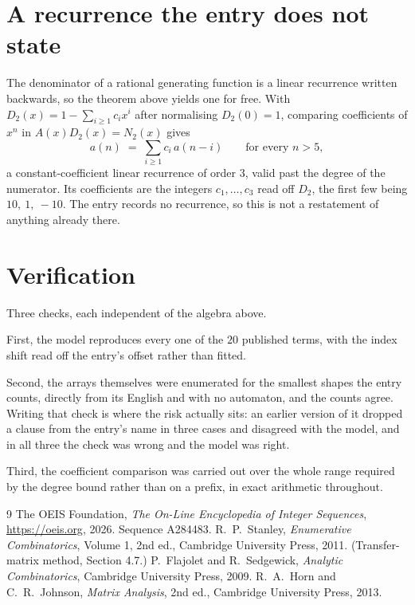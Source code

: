 \documentclass[11pt,a4paper]{article}
\theoremstyle{plain}
\theoremstyle{definition}
\begin{document}
\section{A recurrence the entry does not state}

The denominator of a rational generating function is a linear recurrence written backwards, so
the theorem above yields one for free. With $D_2(x)=1-\sum_{i\ge1}c_ix^i$ after normalising
$D_2(0)=1$, comparing coefficients of $x^n$ in $A(x)D_2(x)=N_2(x)$ gives
\[
a(n)\;=\;\sum_{i\ge1}c_i\,a(n-i)\qquad\text{for every }n>5,
\]
a constant-coefficient linear recurrence of order $3$, valid past the degree of the
numerator. Its coefficients are the integers $c_1,\dots,c_{3}$ read off $D_2$, the first few being $10,\ 1,\ -10$. The entry records no recurrence, so this is not a restatement of anything
already there.

\section{Verification}

Three checks, each independent of the algebra above.

First, the model reproduces every one of the $20$ published terms, with the index shift
read off the entry's offset rather than fitted.

Second, the arrays themselves were enumerated for the smallest shapes the entry counts,
directly from its English and with no automaton, and the counts agree. Writing that check is
where the risk actually sits: an earlier version of it dropped a clause from the entry's name
in three cases and disagreed with the model, and in all three the check was wrong and the model
was right.

Third, the coefficient comparison was carried out over the whole range required by the degree
bound rather than on a prefix, in exact arithmetic throughout.

\begin{thebibliography}{9}
 The OEIS Foundation, \emph{The On-Line Encyclopedia of Integer
Sequences}, \url{https://oeis.org}, 2026. Sequence A284483.
 R.~P.~Stanley, \emph{Enumerative Combinatorics}, Volume 1, 2nd ed.,
Cambridge University Press, 2011. (Transfer-matrix method, Section 4.7.)
 P.~Flajolet and R.~Sedgewick, \emph{Analytic Combinatorics}, Cambridge
University Press, 2009.
 R.~A.~Horn and C.~R.~Johnson, \emph{Matrix Analysis}, 2nd ed., Cambridge
University Press, 2013.
\end{thebibliography}
\end{document}
